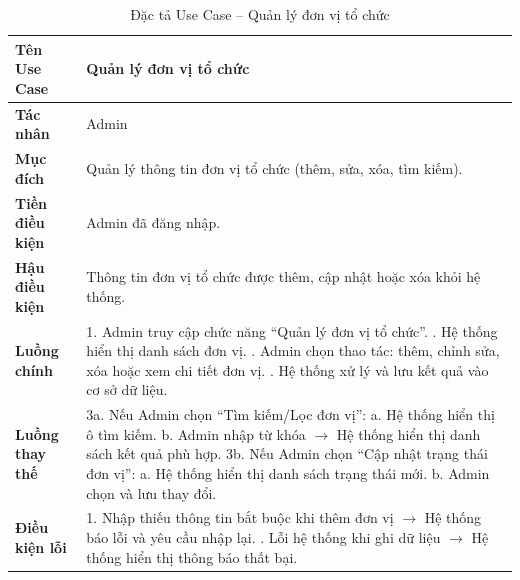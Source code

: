 \renewcommand{\arraystretch}{1.3}
\setlength{\tabcolsep}{8pt}
\begin{longtable}{|p{}|p{}|}
\caption{Đặc tả Use Case -- Quản lý đơn vị tổ chức}
\label{tab:uc_manage_organizer} \\
\hline
\textbf{Tên Use Case} & Quản lý đơn vị tổ chức \\ \hline
\textbf{Tác nhân} & Admin \\ \hline
\textbf{Mục đích} & Quản lý thông tin đơn vị tổ chức (thêm, sửa, xóa, tìm kiếm). \\ \hline
\textbf{Tiền điều kiện} & Admin đã đăng nhập. \\ \hline
\textbf{Hậu điều kiện} & Thông tin đơn vị tổ chức được thêm, cập nhật hoặc xóa khỏi hệ thống. \\ \hline
\textbf{Luồng chính} &
1. Admin truy cập chức năng “Quản lý đơn vị tổ chức”. \newline
2. Hệ thống hiển thị danh sách đơn vị. \newline
3. Admin chọn thao tác: thêm, chỉnh sửa, xóa hoặc xem chi tiết đơn vị. \newline
4. Hệ thống xử lý và lưu kết quả vào cơ sở dữ liệu. \\ \hline
\textbf{Luồng thay thế} &
3a. Nếu Admin chọn “Tìm kiếm/Lọc đơn vị”: \newline
\hspace*{1em}a. Hệ thống hiển thị ô tìm kiếm. \newline
\hspace*{1em}b. Admin nhập từ khóa $\rightarrow$ Hệ thống hiển thị danh sách kết quả phù hợp. \newline
3b. Nếu Admin chọn “Cập nhật trạng thái đơn vị”: \newline
\hspace*{1em}a. Hệ thống hiển thị danh sách trạng thái mới. \newline
\hspace*{1em}b. Admin chọn và lưu thay đổi. \\ \hline
\textbf{Điều kiện lỗi} &
1. Nhập thiếu thông tin bắt buộc khi thêm đơn vị $\rightarrow$ Hệ thống báo lỗi và yêu cầu nhập lại. \newline
2. Lỗi hệ thống khi ghi dữ liệu $\rightarrow$ Hệ thống hiển thị thông báo thất bại. \\ \hline
\end{longtable}
\vspace{15pt}


